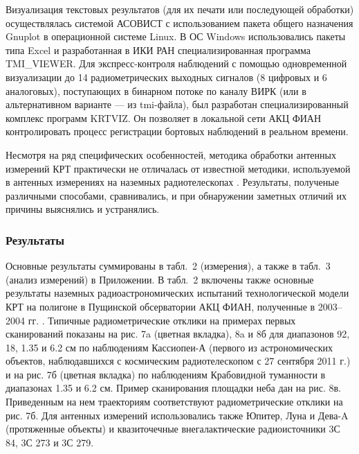 Визуализация текстовых результатов (для их печати или последующей
обработки) осуществлялась системой АСОВИСТ с использованием пакета
общего назначения Gnuplot в операционной системе Linux.
В ОС Windows использовались пакеты типа Excel и разработанная в
ИКИ РАН специализированная программа TMI\_VIEWER.
Для экспресс-контроля наблюдений с помощью одновременной визуализации
до 14 радиометрических выходных сигналов (8 цифровых и 6 аналоговых),
поступающих в бинарном потоке по каналу ВИРК (или  в альтернативном
варианте  --- из tmi-файла), был разработан специализированный комплекс
программ KRTVIZ. Он позволяет в локальной сети АКЦ ФИАН контролировать
процесс регистрации бортовых наблюдений в реальном времени.

Несмотря на ряд специфических особенностей, методика обработки
антенных измерений КРТ практически не отличалась от известной методики,
используемой в антенных измерениях на наземных радиотелескопах
 \cite{}. Результаты, полученые различными способами,
сравнивались, и при обнаружении заметных отличий их причины
выяснялись и устранялись.

\subsubsection{Результаты}


Основные результаты суммированы в табл.~2 (измерения), а также в табл.~3 (анализ измерений) в
Приложении. В табл.~2
включены также основные результаты
наземных радиоастрономических испытаний технологической модели
КРТ на полигоне в Пущинской обсерватории АКЦ ФИАН,
полученные в 2003--2004 гг. \cite{}.
Типичные радиометрические отклики на примерах первых сканирований
показаны на рис. 7a (цветная вкладка), 8a и 8б
для диапазонов 92, 18, 1.35 и
6.2 см по наблюдениям Кассиопеи-А (первого из астрономических объектов,
наблюдавшихся с космическим радиотелескопом с 27 сентября 2011 г.) и
на рис. 7б (цветная вкладка) по наблюдениям Крабовидной туманности в диапазонах 1.35
и 6.2 см. Пример сканирования площадки неба дан на рис. 8в.
Приведенным на нем траекториям соответствуют радиометрические отклики
на рис. 7б. Для антенных измерений использовались также Юпитер, Луна и
Дева-A (протяженные объекты) и квазиточечные внегалактические
радиоисточники 3С 84, 3С 273 и 3С 279.


